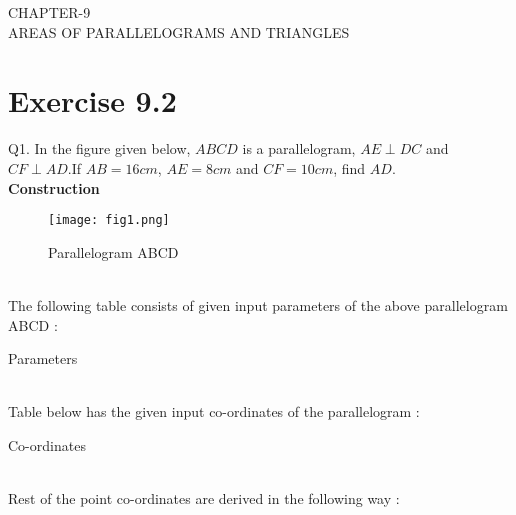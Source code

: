 \documentclass{article}
\begin{document}
\begin{center}
        \textbf\large{CHAPTER-9 \\ AREAS OF PARALLELOGRAMS AND TRIANGLES}
\end{center}
\section{Exercise 9.2}
Q1. In the figure given below, $ABCD$ is a parallelogram, $AE \perp DC$ and $CF \perp AD$.If $AB = 16cm$, $AE = 8cm$ and $CF = 10cm$, find $AD$.\\
\textbf{Construction}\\
\begin{figure}[h]
 \begin{center}
  \texttt{[image: fig1.png]}
 \end{center}
 \caption{Parallelogram ABCD}
 \label{fig:Fig}
\end{figure}\\
\pagebreak
The following table consists of given input parameters of the above parallelogram ABCD :\\
\begin{table}[h]
\centering
	
	\caption{Parameters}
	\label{tab:table1}
\end{table}\\
Table below has the given input co-ordinates of the parallelogram :\\
\begin{table}[h]
	\centering
	
	\caption{Co-ordinates}
	\label{tab:table2}
\end{table}\\
Rest of the point co-ordinates are derived in the following way : \\
\end{document}
